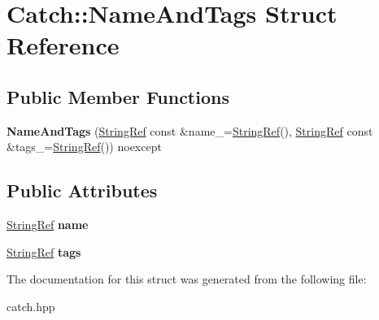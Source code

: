 \hypertarget{structCatch_1_1NameAndTags}{}\section{Catch\+::Name\+And\+Tags Struct Reference}
\label{structCatch_1_1NameAndTags}
\subsection*{Public Member Functions}
\begin{DoxyCompactItemize}
\item 
\mbox{\label{structCatch_1_1NameAndTags_ab585111e615ce8c504a2b9630de8ee94}} 
{\bfseries Name\+And\+Tags} (\mbox{\hyperlink{classCatch_1_1StringRef}{String\+Ref}} const \&name\+\_\+=\mbox{\hyperlink{classCatch_1_1StringRef}{String\+Ref}}(), \mbox{\hyperlink{classCatch_1_1StringRef}{String\+Ref}} const \&tags\+\_\+=\mbox{\hyperlink{classCatch_1_1StringRef}{String\+Ref}}()) noexcept
\end{DoxyCompactItemize}
\subsection*{Public Attributes}
\begin{DoxyCompactItemize}
\item 
\mbox{\label{structCatch_1_1NameAndTags_a7cbea60e0cebfa622c667008eb011420}} 
\mbox{\hyperlink{classCatch_1_1StringRef}{String\+Ref}} {\bfseries name}
\item 
\mbox{\label{structCatch_1_1NameAndTags_a74062ed1138834a348424eb7ed900c57}} 
\mbox{\hyperlink{classCatch_1_1StringRef}{String\+Ref}} {\bfseries tags}
\end{DoxyCompactItemize}


The documentation for this struct was generated from the following file\+:\begin{DoxyCompactItemize}
\item 
catch.\+hpp\end{DoxyCompactItemize}
